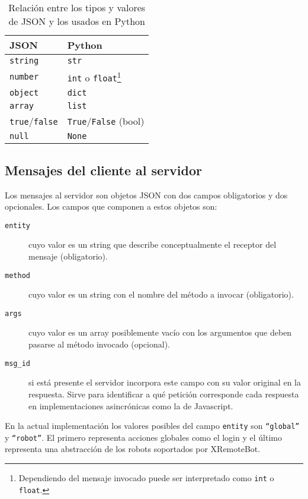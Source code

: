 \begin{table}
    \centering
    \begin{tabu}{l|l}
        JSON & Python \\
        \hline
        \texttt{string} & \texttt{str} \\
        \texttt{number} & \texttt{int} o \texttt{float}\footnote{Dependiendo
        del mensaje invocado
        puede ser interpretado como \texttt{int} o \texttt{float}.}\\
        \texttt{object} & \texttt{dict} \\
        \texttt{array}  & \texttt{list} \\
        \texttt{true}/\texttt{false} & \texttt{True}/\texttt{False} (bool) \\
        \texttt{null} & \texttt{None} \\
    \end{tabu}
    \caption{Relación entre los tipos y valores de JSON y los usados en
    Python}
    \label{tbl:rel_json_python}
\end{table}

\subsection{Mensajes del cliente al servidor}

Los mensajes al servidor son objetos JSON con dos campos obligatorios y dos
opcionales. Los campos que componen a estos objetos  son:

\begin{description}
    \item[\texttt{entity}] cuyo valor es un string que describe conceptualmente
        el receptor del mensaje (obligatorio).
    \item[\texttt{method}] cuyo valor es un string con el nombre del método a
        invocar (obligatorio).
    \item[\texttt{args}] cuyo valor es un array posiblemente vacío con los
        argumentos que deben pasarse al método invocado (opcional).
    \item[\texttt{msg\_id}] si está presente el servidor incorpora este
        campo con su valor original en la respuesta. Sirve para identificar a
        qué petición
        corresponde cada respuesta en implementaciones asincrónicas
        como la de Javascript.
\end{description}

En la actual implementación los valores posibles del campo \texttt{entity} son
\texttt{``global''} y \texttt{``robot''}. El primero
representa acciones globales como el login y el último representa una
abstracción de los robots soportados por XRemoteBot.

